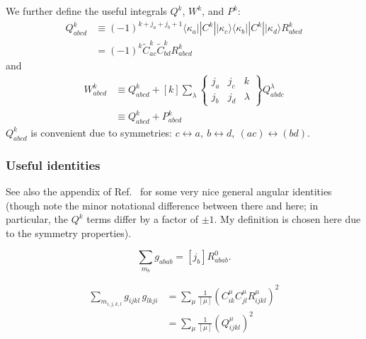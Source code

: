 \documentclass[10pt,twocolumn,a4paper]{article}%
\newcommand{\bra}[1]{\ensuremath{\langle #1|}}	%
\newcommand{\ket}[1]{\ensuremath{|#1\rangle}}	%
\newcommand{\sixj}[6]{\ensuremath{\begin{Bmatrix}#1&#2&#3\\#4&#5&#6\end{Bmatrix}}}	%
\newcommand{\be}{\begin{equation}}
\newcommand{\ee}{\end{equation}}
\renewcommand{\k}{\ensuremath{\kappa}}
\begin{document}
We further define the useful integrals $Q^k$, $W^k$, and $P^k$:
\begin{align}
Q^k_{abcd} &\equiv  (-1)^{k + j_a+j_b+1}\bra{\k_a}|C^k|\ket{\k_c} \bra{\k_b}|C^k|\ket{\k_d} R^k_{abcd} \\
&= (-1)^k \widetilde C^k_{ac}\widetilde C^k_{bd}R^k_{abcd}
\end{align}
and
\begin{align}
W^k_{abcd} &\equiv Q^k_{abcd} + [k] \sum_\lambda \sixj{j_a}{j_c}{k}{j_b}{j_d}{\lambda}Q^\lambda_{abdc} \\
& \equiv Q^k_{abcd}  + P^k_{abcd}
\end{align}
$Q^k_{abcd}$  is convenient due to symmetries: $c\leftrightarrow a ,~ b\leftrightarrow d  ,~ (ac)\leftrightarrow (bd)$.%



\subsubsection*{Useful identities}


See also the appendix of Ref.~\cite{DzubaHFS1984} for some very nice general angular identities (though note the minor notational difference between there and here; in particular, the $Q^k$ terms differ by a factor of $\pm1$. My definition is chosen here due to the symmetry properties).

\be
\sum_{m_b}g_{abab} = [j_b] R^0_{abab}.
\ee




\begin{align}
\sum_{m_{i,j,k,l}}  g_{ijkl} \, g_{lkji}
    &= \sum_\mu \frac{1}{[\mu]} \left( C^\mu_{ik}C^\mu_{jl} R^\mu_{ijkl}\right)^2 \\
    &= \sum_\mu \frac{1}{[\mu]} \left( Q^\mu_{ijkl}\right)^2 
\end{align}
\end{document}

